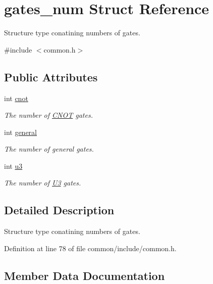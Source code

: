 \hypertarget{structgates__num}{}\section{gates\+\_\+num Struct Reference}
\label{structgates__num}


Structure type conatining numbers of gates.  




{\ttfamily \#include $<$common.\+h$>$}

\subsection*{Public Attributes}
\begin{DoxyCompactItemize}
\item 
int \hyperlink{structgates__num_abcf819b25f7319deb68b22ef23dd109e}{cnot}
\begin{DoxyCompactList}\small\item\em The number of \hyperlink{class_c_n_o_t}{C\+N\+OT} gates. \end{DoxyCompactList}\item 
int \hyperlink{structgates__num_aed89b33df39ec82ae7f620c944d66846}{general}
\begin{DoxyCompactList}\small\item\em The number of general gates. \end{DoxyCompactList}\item 
int \hyperlink{structgates__num_a4a2b09456d5676e18d441cff35f375d9}{u3}
\begin{DoxyCompactList}\small\item\em The number of \hyperlink{class_u3}{U3} gates. \end{DoxyCompactList}\end{DoxyCompactItemize}


\subsection{Detailed Description}
Structure type conatining numbers of gates. 

Definition at line 78 of file common/include/common.\+h.



\subsection{Member Data Documentation}
